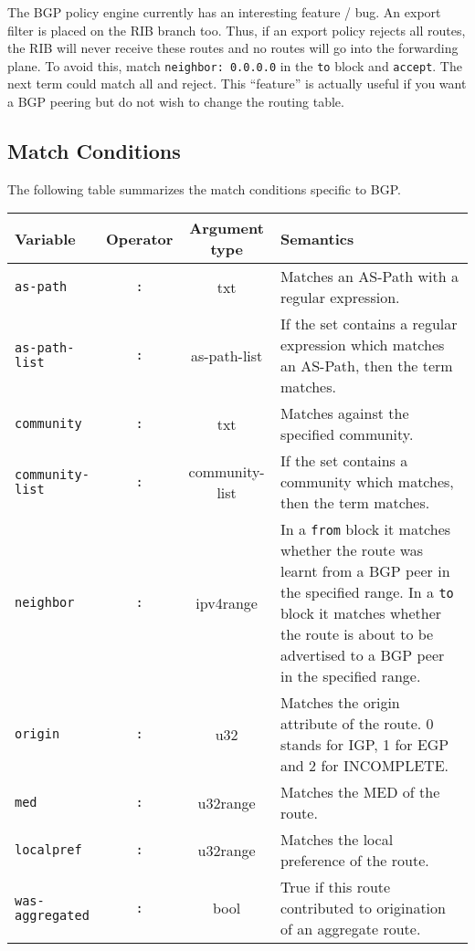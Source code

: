 The BGP policy engine currently has an interesting feature / bug.  An export
filter is placed on the RIB branch too.  Thus, if an export policy rejects all
routes, the RIB will never receive these routes and no routes will go into the
forwarding plane.  To avoid this, match {\tt neighbor: 0.0.0.0} in the {\tt to}
block and {\tt accept}.  The next term could match all and reject.  This
``feature'' is actually useful if you want a BGP peering but do not wish to
change the routing table.

\subsection{Match Conditions}
The following table summarizes the match conditions specific to BGP.
\begin{center}
\begin{tabular}{|l|c|c|p{7cm}|}
\hline
Variable & Operator & Argument type & Semantics \\
\hline\hline
{\tt as-path} & {\tt :} & txt & Matches an AS-Path with a regular expression. \\
{\tt as-path-list} & {\tt :} & as-path-list & If the set contains a regular
expression which matches an AS-Path, then the term matches. \\
\hline
{\tt community} & {\tt :} & txt & Matches against the specified community. \\
{\tt community-list} & {\tt :} & community-list & If the set contains a
community which matches, then the term matches. \\
\hline
{\tt neighbor} & {\tt :} & ipv4range & In a {\tt from} block it matches whether
the route was learnt from a BGP peer in the specified range.  In a {\tt to}
block it matches whether the route is about to be advertised to a BGP peer in
the specified range. \\
\hline
{\tt origin} & {\tt :} & u32 & Matches the origin attribute of the route. 0
stands for IGP, 1 for EGP and 2 for INCOMPLETE.  \\
\hline
{\tt med} & {\tt :} & u32range & Matches the MED of the route. \\
\hline
{\tt localpref} & {\tt :} & u32range & Matches the local preference of the route. \\
\hline
{\tt was-aggregated} & {\tt :} & bool & True if this route contributed to
origination of an aggregate route. \\
\hline
\end{tabular}
\end{center}

